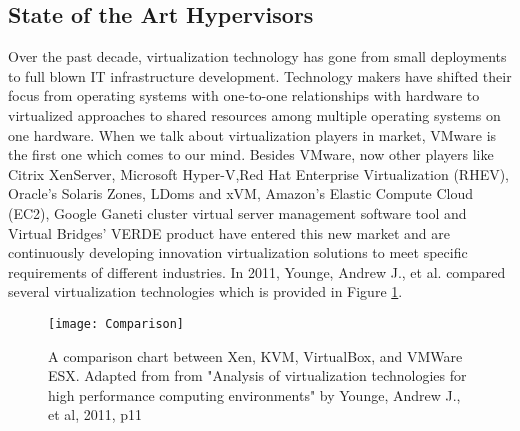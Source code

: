 \subsection{State of the Art Hypervisors\label{sec:comp}}
Over the past decade, virtualization technology has gone from small deployments to full blown IT infrastructure development. Technology makers have shifted their focus from operating systems with one-to-one relationships with hardware to virtualized approaches to shared resources among multiple operating systems on one hardware. When we talk about virtualization players in market, VMware is the first one which comes to our mind. Besides VMware, now other players like Citrix XenServer, Microsoft Hyper-V,Red Hat Enterprise Virtualization (RHEV), Oracle's Solaris Zones, LDoms and xVM, Amazon's Elastic Compute Cloud (EC2), Google Ganeti cluster virtual server management software tool and Virtual Bridges' VERDE product \cite{players} have entered this new market and are continuously developing innovation virtualization solutions to meet specific requirements of different industries. In 2011, Younge, Andrew J., et al. \cite{younge2011analysis} compared several virtualization technologies which is provided in Figure \ref{comparison}.
\begin{figure}[!htbp]
	\centering
	\texttt{[image: Comparison]}
	\caption{A comparison chart between Xen, KVM, VirtualBox, and VMWare ESX. Adapted from from "Analysis of virtualization technologies for high performance computing environments" by Younge, Andrew J., et al, 2011, p11}
	\label{comparison}
\end{figure}


